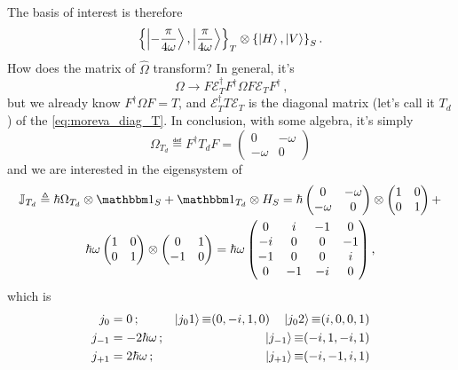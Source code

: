 The basis of interest is therefore
\begin{equation}
  \qty{\ket{-\frac{\pi}{4\omega}}, \ket{\frac{\pi}{4\omega}}}_T \otimes \qty{\ket{H}, \ket{V}}_S
  \, \text{.}
\end{equation}
How does the matrix of $\hat{\Omega}$ transform? In general, it's
\begin{equation}
  \Omega \rightarrow F \mathcal{E}_T^{\dagger} F^{\dagger} \Omega F \mathcal{E}_T F^{\dagger}
  \, \text{,}
\end{equation}
but we already know $F^{\dagger} \Omega F = T$,
and $\mathcal{E}_T^{\dagger} T \mathcal{E}_T$ is the diagonal matrix
(let's call it $T_d$) of the \eqref{eq:moreva_diag_T}.
In conclusion, with some algebra, it's simply
\begin{equation}
  \Omega_{T_d} \eqdef F^{\dagger} T_d F = \left(\begin{matrix}0 & - \omega\\- \omega & 0\end{matrix}\right)
\end{equation}
and we are interested in the eigensystem of
\begin{multline}
  \mathbb{J}_{T_d} \eqdef \hbar \Omega_{T_d} \ox \idop_{S} + \idop_{T_d} \ox H_S =
    \hbar
    \begin{pmatrix}0 & - \omega\\- \omega & 0\end{pmatrix}
    \ox
    \begin{pmatrix} 1 & 0 \\  0 & 1 \end{pmatrix}
    + \\
    \hbar\omega
    \begin{pmatrix} 1 & 0 \\  0 & 1 \end{pmatrix}
    \ox
    \begin{pmatrix} 0 & 1 \\ -1 & 0 \end{pmatrix}
    =
    \hbar\omega
    \begin{pmatrix}
      0   &i  &-1 &0  \\
      -i  &0  &0  &-1 \\
      -1  &0  &0  &i  \\
      0   &-1 &-i &0  
    \end{pmatrix}
  \text{,}
\end{multline}
which is
\begin{align}
  j_0     &= 0\,\text{;}              &\ket{j_{0}1}   \operatorname*{\equiv} (0, -i, 1, 0) \quad \ket{j_0 2} \operatorname*{\equiv} (i, 0, 0 ,1)
    \label{eq:moreva:eigenJ0} \\
  j_{-1}  &= -2\hbar\omega\,\text{;}  &\ket{j_{-1}}   \operatorname*{\equiv} (-i, 1, -i, 1) \\
  j_{+1}   &= 2\hbar\omega\,\text{;}  &\ket{j_{+1}}   \operatorname*{\equiv} (-i, -1, i, 1)
\end{align}

